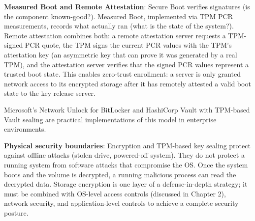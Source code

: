 \textbf{Measured Boot and Remote Attestation}: Secure Boot verifies signatures (is the component known-good?). Measured Boot, implemented via TPM PCR measurements, records what actually ran (what is the state of the system?). Remote attestation combines both: a remote attestation server requests a TPM-signed PCR quote, the TPM signs the current PCR values with the TPM's attestation key (an asymmetric key that can prove it was generated by a real TPM), and the attestation server verifies that the signed PCR values represent a trusted boot state. This enables zero-trust enrollment: a server is only granted network access to its encrypted storage after it has remotely attested a valid boot state to the key release server.

Microsoft's Network Unlock for BitLocker and HashiCorp Vault with TPM-based Vault sealing are practical implementations of this model in enterprise environments.

\textbf{Physical security boundaries}: Encryption and TPM-based key sealing protect against offline attacks (stolen drive, powered-off system). They do not protect a running system from software attacks that compromise the OS. Once the system boots and the volume is decrypted, a running malicious process can read the decrypted data. Storage encryption is one layer of a defense-in-depth strategy; it must be combined with OS-level access controls (discussed in Chapter 2), network security, and application-level controls to achieve a complete security posture.

